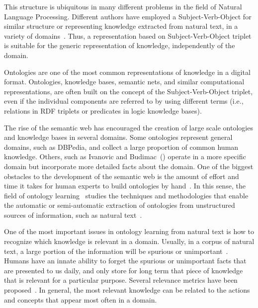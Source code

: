 This structure is ubiquitous in many different problems in the field of Natural Language Processing.
Different authors have employed a Subject-Verb-Object for similar structure or representing knowledge extracted from natural text, in a variety of domains~\cite{never-ending-learner,emotinet}.
Thus, a representation based on Subject-Verb-Object triplet is suitable for the generic representation of knowledge, independently of the domain.

Ontologies are one of the most common representations of knowledge in a digital format.
Ontologies, knowledge bases, semantic nets, and similar computational representations, are often built on the concept of the Subject-Verb-Object triplet, even if the individual components are referred to by using different terms (i.e., relations in RDF triplets or predicates in logic knowledge bases).

The rise of the semantic web has encouraged the creation of large scale ontologies and knowledge bases in several domains.
Some ontologies represent general domains, such as DBPedia, and collect a large proportion of common human knowledge.
Others, such as Ivanovic and Budimac~(\cite{IVANOVIC20145158}) operate in a more specific domain but incorporate more detailed facts about the domain.
One of the biggest obstacles to the development of the semantic web is the amount of effort and time it takes for human experts to build ontologies by hand~\cite{gomez2006ontological, petasis2011ontology}.
In this sense, the field of ontology learning~\cite{buitelaar2005ontology} studies the techniques and methodologies that enable the automatic or semi-automatic extraction of ontologies from unstructured sources of information, such as natural text~\cite{mitchell2015never,emotinet}.

One of the most important issues in ontology learning from natural text is how to recognize which knowledge is relevant in a domain. Usually, in a corpus of natural text, a large portion of the information will be spurious or unimportant~\cite{Kanya2009InformationE}.
Humans have an innate ability to forget the spurious or unimportant facts that are presented to us daily, and only store for long term that piece of knowledge that is relevant for a particular purpose.
Several relevance metrics have been proposed~\cite{manning2008introduction, brank2005survey}.
In general, the most relevant knowledge can be related to the actions and concepts that appear most often in a domain.


